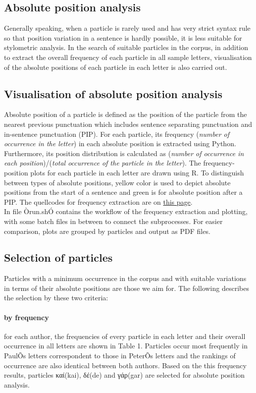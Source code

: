 \documentclass[a4paper]{article}
\begin{document}
\subsection{Absolute position analysis}
Generally speaking, when a particle is rarely used and has very strict syntax rule so that position variation in a sentence is hardly possible, it is less suitable for stylometric analysis. In the search of suitable particles in the corpus, in addition to extract the overall frequency of each particle in all sample letters, visualisation of the absolute positions of each particle in each letter is also carried out.  

\subsection{Visualisation of absolute position analysis}
Absolute position of a particle is defined as the position of the particle from the nearest previous punctuation which includes sentence separating punctuation and in-sentence punctuation (PIP). For each particle, its frequency (\textit{number of occurrence in the letter}) in each absolute position is extracted using Python. Furthermore, its position distribution is calculated as (\textit{number of occurrence in each position})/(\textit{total occurrence of the particle in the letter}). The frequency-position plots for each particle in each letter are drawn using R. To distinguish between types of absolute positions, yellow color is used to depict absolute positions from the start of a sentence and green is for absolute position after a PIP. The quellcodes for frequency extraction are on \href{https://github.com/KLINGTdotNET/dh-project-ws14/tree/master/src/absolute_freq}{this page}. \\

\noindent In file Òrun.shÓ contains the workflow of the frequency extraction and plotting, with some batch files in between to connect the subprocesses. For easier comparison, plots are grouped by particles and output as PDF files. 

\subsection{Selection of particles}
Particles with a minimum occurrence in the corpus and with suitable variations in terms of their absolute positions are those we aim for. The following describes the selection by these two criteria:

\paragraph{by frequency} 
for each author, the frequencies of every particle in each letter and their overall occurrence in all letters are shown in Table 1. Particles occur most frequently in PaulÕs letters correspondent to those in PeterÕs letters and the rankings of occurrence are also identical between both authors. Based on the this frequency results,  particles \textgreek{καί}(kai), \textgreek{δέ}(de) and \textgreek{γάρ}(gar) are selected for absolute position analysis. \\
\end{document}
